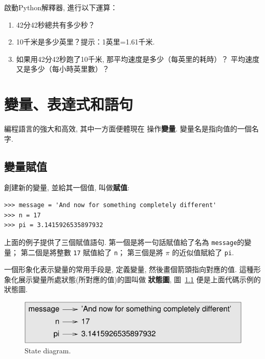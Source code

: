 \documentclass[10pt]{book}
\begin{document}
\begin{exercise}

啟動Python解釋器, 進行以下運算：

\begin{enumerate}

\item 42分42秒總共有多少秒？

\item 10千米是多少英里？提示：1英里=1.61千米. 

\item 如果用42分42秒跑了10千米, 那平均速度是多少（每英里的耗時）？
平均速度又是多少（每小時英里數）？


\end{enumerate}

\end{exercise}


\chapter{變量、表達式和語句}

編程語言的強大和高效, 其中一方面便體現在 操作{\bf 變量}. 
變量名是指向值的一個名字. 


\section{變量賦值}
\label{variables}

創建新的變量, 並給其一個值, 叫做{\bf 賦值}: 

\begin{verbatim}
>>> message = 'And now for something completely different'
>>> n = 17
>>> pi = 3.1415926535897932
\end{verbatim}
%
上面的例子提供了三個賦值語句. 
第一個是將一句話賦值給了名為 {\tt message}的變量；
第二個是將整數 {\tt 17} 賦值給了 {\tt n}；
第三個是將 $\pi$ 的近似值賦給了 {\tt pi}. 

一個形象化表示變量的常用手段是, 定義變量, 然後畫個箭頭指向對應的值. 
這種形象化展示變量所處狀態(所對應的值)的圖叫做 {\bf 狀態圖}, 
圖~\ref{fig.state2} 便是上面代碼示例的狀態圖. 

\begin{figure}
\centerline
{\includegraphics[scale=0.8]{figs/state2.pdf}}
\caption{State diagram.}
\label{fig.state2}
\end{figure}
\end{document}
